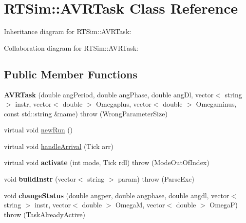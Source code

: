\hypertarget{classRTSim_1_1AVRTask}{}\section{R\+T\+Sim\+:\+:A\+V\+R\+Task Class Reference}
\label{classRTSim_1_1AVRTask}


Inheritance diagram for R\+T\+Sim\+:\+:A\+V\+R\+Task\+:


Collaboration diagram for R\+T\+Sim\+:\+:A\+V\+R\+Task\+:
\subsection*{Public Member Functions}
\begin{DoxyCompactItemize}
\item 
{\bfseries A\+V\+R\+Task} (double ang\+Period, double ang\+Phase, double ang\+Dl, vector$<$ string $>$ instr, vector$<$ double $>$ Omegaplus, vector$<$ double $>$ Omegaminus, const std\+::string \&name)  throw (\+Wrong\+Parameter\+Size)\hypertarget{classRTSim_1_1AVRTask_a877b0615442db3f74278575d48c36668}{}\label{classRTSim_1_1AVRTask_a877b0615442db3f74278575d48c36668}

\item 
virtual void \hyperlink{classRTSim_1_1AVRTask_af1704bc41d6e891d986f71f40c960b6a}{new\+Run} ()
\item 
virtual void \hyperlink{classRTSim_1_1AVRTask_ad2daf3084278c3f85144a70fdb14178a}{handle\+Arrival} (Tick arr)
\item 
virtual void {\bfseries activate} (int mode, Tick rdl)  throw (\+Mode\+Out\+Of\+Index)\hypertarget{classRTSim_1_1AVRTask_afc95a09046f0c58cc7ae83a62ba301f5}{}\label{classRTSim_1_1AVRTask_afc95a09046f0c58cc7ae83a62ba301f5}

\item 
void {\bfseries build\+Instr} (vector$<$ string $>$ param)  throw (\+Parse\+Exc)\hypertarget{classRTSim_1_1AVRTask_a86ceb0a475aa717f14e4445cc0611acc}{}\label{classRTSim_1_1AVRTask_a86ceb0a475aa717f14e4445cc0611acc}

\item 
void {\bfseries change\+Status} (double angper, double angphase, double angdl, vector$<$ string $>$ instr, vector$<$ double $>$ OmegaM, vector$<$ double $>$ OmegaP)  throw (\+Task\+Already\+Active)\hypertarget{classRTSim_1_1AVRTask_a60071754e31333fe79519de684aa82b2}{}\label{classRTSim_1_1AVRTask_a60071754e31333fe79519de684aa82b2}


\end{DoxyCompactItemize}
